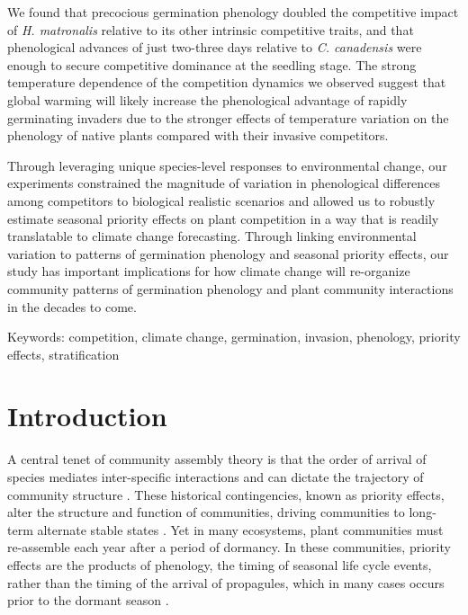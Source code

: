 \documentclass{article}[11pt]
\begin{document}
We found that precocious germination phenology doubled the competitive impact of \textit{H. matronalis} relative to its other intrinsic competitive traits, and that phenological advances of just two-three days relative to \textit{C. canadensis} were enough to secure competitive dominance at the seedling stage. %
The strong temperature dependence of the competition dynamics we observed suggest that global warming will likely increase the phenological advantage of rapidly germinating invaders due to the stronger effects of temperature variation on the phenology of native plants compared with their invasive competitors.

Through leveraging unique species-level responses to environmental change, our experiments constrained the magnitude of variation in phenological differences among competitors to biological realistic scenarios and allowed us to robustly estimate seasonal priority effects on plant competition in a way that is readily translatable to climate change forecasting. Through linking environmental variation to patterns of germination phenology and seasonal priority effects, our study has important implications for how climate change will re-organize community patterns of germination phenology and plant community interactions in the decades to come.

Keywords: competition, climate change, germination, invasion, phenology, priority effects, stratification

\pagebreak
\section*{Introduction}
 A central tenet of community assembly theory is that the order of arrival of species mediates inter-specific interactions and can dictate the trajectory of community structure \citep{Fukami2015}. These historical contingencies, known as priority effects, alter the structure and function of communities, driving communities to long-term alternate stable states \citep{Fukami2011}. Yet in many ecosystems, plant communities must re-assemble each year after a period of dormancy. In these communities, priority effects are the products of phenology, the timing of seasonal life cycle events, %
rather than the timing of the arrival of propagules, which in many cases occurs prior to the dormant season \citep{Rudolf:2019aa,Howe:1982aa,Baskin:1988aa}. 
\end{document}
